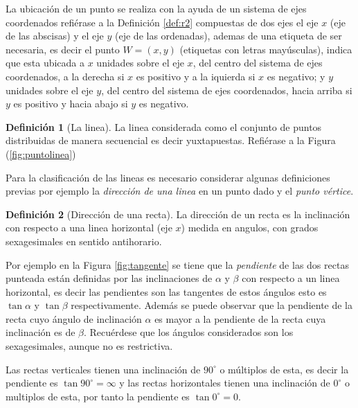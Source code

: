 \documentclass[16pt,]{krantz}
\theoremstyle{definition}
\newtheorem{definition}{Definición}[chapter]
\theoremstyle{definition}
\theoremstyle{definition}
\theoremstyle{definition}
\theoremstyle{remark}
\begin{document}
La ubicación de un punto se realiza con la ayuda de un sistema de ejes coordenados refiérase a la Definición \ref{def:r2} compuestas de dos ejes el eje \(x\) (eje de las abscisas) y el eje \(y\) (eje de las ordenadas), ademas de una etiqueta de ser necesaria, es decir el punto \(W=(x,y)\) (etiquetas con letras mayúsculas), indica que esta ubicada a \(x\) unidades sobre el eje \(x\), del centro del sistema de ejes coordenados, a la derecha si \(x\) es positivo y a la iquierda si \(x\) es negativo; y \(y\) unidades sobre el eje \(y\), del centro del sistema de ejes coordenados, hacia arriba si \(y\) es positivo y hacia abajo si \(y\) es negativo.

\begin{definition}[La linea]
\protect\hypertarget{def:linea}{}{\label{def:linea} {} }La linea considerada como el conjunto de puntos distribuidas de manera secuencial es decir yuxtapuestas. Refiérase a la Figura (\ref{fig:puntolinea})
\end{definition}

Para la clasificación de las lineas es necesario considerar algunas definiciones previas por ejemplo la \emph{dirección de una linea} en un punto dado y el \emph{punto vértice}.

\begin{definition}[Dirección de una recta]
\protect\hypertarget{def:direccionrecta}{}{\label{def:direccionrecta} {} }La dirección de un recta es la inclinación con respecto a una linea horizontal (eje \(x\)) medida en angulos, con grados sexagesimales en sentido antihorario.
\end{definition}

Por ejemplo en la Figura \ref{fig:tangente} se tiene que la \emph{pendiente} de las dos rectas punteada están definidas por las inclinaciones de \(\alpha\) y \(\beta\) con respecto a un linea horizontal, es decir las pendientes son las tangentes de estos ángulos esto es \(\tan \alpha\) y \(\tan \beta\) respectivamente. Además se puede observar que la pendiente de la recta cuyo ángulo de inclinación \(\alpha\) es mayor a la pendiente de la recta cuya inclinación es de \(\beta\). Recuérdese que los ángulos considerados son los sexagesimales, aunque no es restrictiva.

Las rectas verticales tienen una inclinación de \(90^\circ\) o múltiplos de esta, es decir la pendiente es \(\tan 90^\circ=\infty\) y las rectas horizontales tienen una inclinación de \(0^\circ\) o multiplos de esta, por tanto la pendiente es \(\tan 0^\circ=0\).
\end{document}
